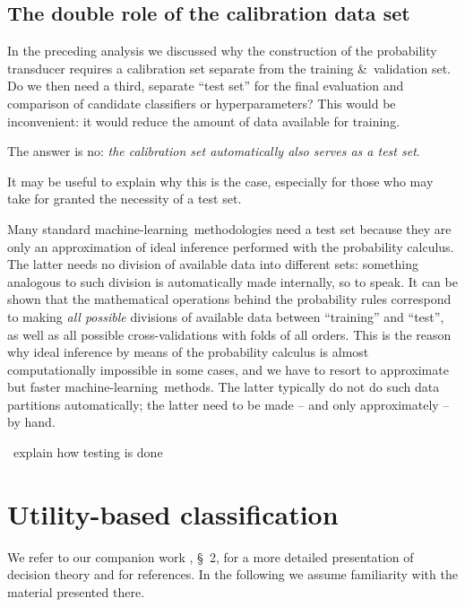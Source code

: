 \documentclass[\ifafour a4paper,12pt,\else a5paper,10pt,\fi%
onecolumn,oneside,article,%
british%
]{memoir}
\theoremstyle{remark}
\theoremstyle{innote}
\newcommand*{\amp}{\&}
\newcommand*{\pencil}{{\fontencoding{U}\fontfamily{fontawesometwo}\selectfont\symbol{210}}}
\newcommand{\mynotep}[1]{{\footnotesize\color{notecolour}\pencil\ #1}}
\renewcommand*{\|}[1][]{\nonscript\:#1\vert\nonscript\:\mathopen{}}
\newcommand*{\sect}{\S}%
\newcommand*{\ml}{machine-learning}
\begin{document}
\subsection{The double role of the calibration data set}
\label{sec:role_calibration_set}

In the preceding analysis we discussed why the construction of the probability transducer requires a calibration set separate from the training \amp\ validation set. Do we then need a third, separate \enquote{test set} for the final evaluation and comparison of candidate classifiers or hyperparameters? This would be inconvenient: it would reduce the amount of data available for training.

The answer is no: \emph{the calibration set automatically also serves as a test set}.

It may be useful to explain why this is the case, especially for those who may take for granted the necessity of a test set.

Many standard \ml\ methodologies need a test set because they are only an approximation of ideal inference performed with the probability calculus. The latter needs no division of available data into different sets: something analogous to such division is automatically made internally, so to speak. It can be shown \autocites{portamana2019b,fongetal2020}[many examples of this fact are scattered across the text by][]{jaynes1994_r2003} that the mathematical operations behind the probability rules correspond to making \emph{all possible} divisions of available data between \enquote{training} and \enquote{test}, as well as all possible cross-validations with folds of all orders. This is the reason why ideal inference by means of the probability calculus is almost computationally impossible in some cases, and we have to resort to approximate but faster \ml\ methods. The latter typically do not do such data partitions automatically; the latter need to be made -- and only approximately -- by hand.


\mynotep{explain how testing is done}

\section{Utility-based classification}
\label{sec:utility_classification}

We refer to our companion work \cite{dyrlandetal2022}, \sect~2, for a more detailed presentation of decision theory and for references. In the following we assume familiarity with the material presented there.
\end{document}
